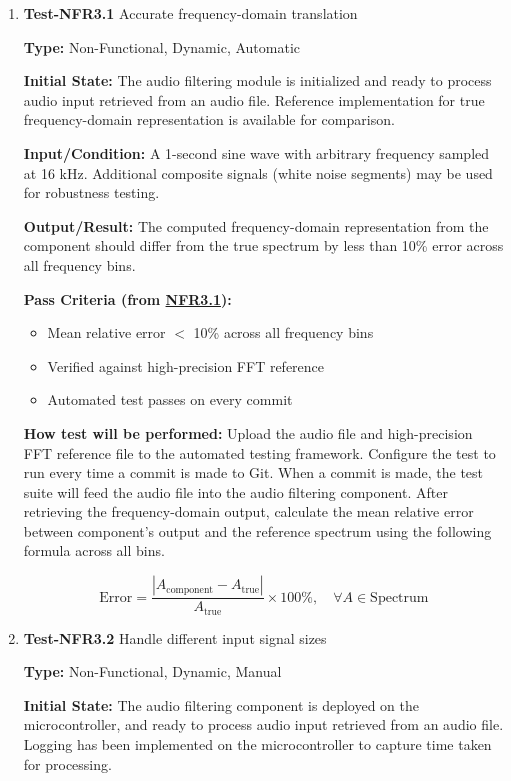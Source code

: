 \documentclass[12pt, titlepage]{article}
\begin{document}
\begin{enumerate}

\item{\textbf{Test-NFR3.1} Accurate frequency-domain translation\\}

\textbf{Type:} Non-Functional, Dynamic, Automatic
					
\textbf{Initial State:} 
The audio filtering module is initialized and ready to process audio input
retrieved from an audio file. Reference implementation for true frequency-domain
representation is available for comparison. 
					
\textbf{Input/Condition:} 
A 1-second sine wave with arbitrary frequency sampled at 16 kHz. Additional
composite signals (white noise segments) may be used for robustness testing. 
					
\textbf{Output/Result:} 
The computed frequency-domain representation from the component should differ
from the true spectrum by less than 10\% error across all frequency bins.

\textbf{Pass Criteria (from \hyperref[SRS-NFR3_1]{NFR3.1}):}
\begin{itemize}
\item Mean relative error $<$ 10\% across all frequency bins
\item Verified against high-precision FFT reference
\item Automated test passes on every commit
\end{itemize}
					
\textbf{How test will be performed:} 
Upload the audio file and high-precision FFT reference file to the automated
testing framework. Configure the test to run every time a commit is made to Git.
When a commit is made, the test suite will feed the audio file into the audio
filtering component. After retrieving the frequency-domain output, calculate the
mean relative error between component's output and the reference spectrum using
the following formula across all bins.

\[
\text{Error} = \frac{\left|A_{\text{component}} - A_{\text{true}}\right|}{A_{\text{true}}} \times 100\%, 
\quad \forall A \in \text{Spectrum}
\]
					
\item{\textbf{Test-NFR3.2} Handle different input signal sizes\\}

\textbf{Type:} Non-Functional, Dynamic, Manual
					
\textbf{Initial State:} 
The audio filtering component is deployed on the microcontroller, and ready to
process audio input retrieved from an audio file. Logging has been implemented
on the microcontroller to capture time taken for processing.
					

\end{enumerate}
\end{document}
